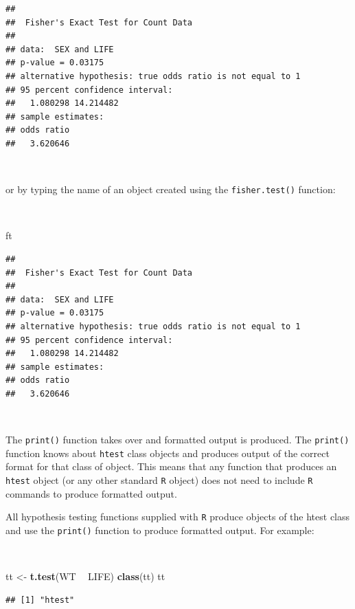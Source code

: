 \documentclass[12pt,a4paper]{book}
\newenvironment{Shaded}{\begin{snugshade}}{\end{snugshade}}
\newcommand{\KeywordTok}[1]{\textcolor[rgb]{0.13,0.29,0.53}{\textbf{#1}}}
\newcommand{\NormalTok}[1]{#1}
\newcommand{\OperatorTok}[1]{\textcolor[rgb]{0.81,0.36,0.00}{\textbf{#1}}}
\newcommand{\StringTok}[1]{\textcolor[rgb]{0.31,0.60,0.02}{#1}}
\theoremstyle{definition}
\theoremstyle{definition}
\theoremstyle{definition}
\theoremstyle{remark}
\begin{document}
\begin{verbatim}
## 
##  Fisher's Exact Test for Count Data
## 
## data:  SEX and LIFE
## p-value = 0.03175
## alternative hypothesis: true odds ratio is not equal to 1
## 95 percent confidence interval:
##   1.080298 14.214482
## sample estimates:
## odds ratio 
##   3.620646
\end{verbatim}

~

or by typing the name of an object created using the
\texttt{fisher.test()} function:

~

\begin{Shaded}
\begin{Highlighting}[]
\NormalTok{ft}
\end{Highlighting}
\end{Shaded}

\begin{verbatim}
## 
##  Fisher's Exact Test for Count Data
## 
## data:  SEX and LIFE
## p-value = 0.03175
## alternative hypothesis: true odds ratio is not equal to 1
## 95 percent confidence interval:
##   1.080298 14.214482
## sample estimates:
## odds ratio 
##   3.620646
\end{verbatim}

~

The \texttt{print()} function takes over and formatted output is
produced. The \texttt{print()} function knows about \texttt{htest} class
objects and produces output of the correct format for that class of
object. This means that any function that produces an \texttt{htest}
object (or any other standard \texttt{R} object) does not need to
include \texttt{R} commands to produce formatted output.

All hypothesis testing functions supplied with \texttt{R} produce
objects of the htest class and use the \texttt{print()} function to
produce formatted output. For example:

~

\begin{Shaded}
\begin{Highlighting}[]
\NormalTok{tt <-}\StringTok{ }\KeywordTok{t.test}\NormalTok{(WT }\OperatorTok{~}\StringTok{ }\NormalTok{LIFE)}
\KeywordTok{class}\NormalTok{(tt)}
\NormalTok{tt}
\end{Highlighting}
\end{Shaded}

\begin{verbatim}
## [1] "htest"
\end{verbatim}
\end{document}
